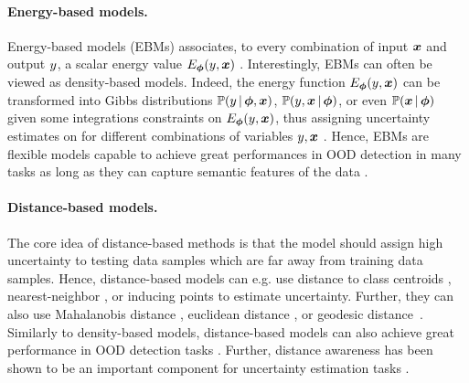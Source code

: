 \paragraph*{Energy-based models.} Energy-based models (EBMs) associates, to every combination of input $\bm{x}$ and output $y$, a scalar energy value $E_{\bm{\phi}}(y, \bm{x})$ \cite{lecun2006tutorial}. Interestingly, EBMs can often be viewed as density-based models. Indeed, the energy function $E_{\bm{\phi}}(y, \bm{x})$ can be transformed into Gibbs distributions $\mathbb{P}(y \,|\, \bm{\phi}, \bm{x})$, $\mathbb{P}(y, \bm{x} \,|\, \bm{\phi})$, or even $\mathbb{P}(\bm{x} \,|\, \bm{\phi})$ given some integrations constraints on $E_{\bm{\phi}}(y, \bm{x})$, thus assigning uncertainty estimates on for different combinations of variables $y, \bm{x}$ \cite{energy_based_classifier}. Hence, EBMs are flexible models capable to achieve great performances in OOD detection in many tasks \citep{energy-ood,wang2021ebm} as long as they can capture semantic features of the data \cite{ood_ebm}.

\paragraph*{Distance-based models.} The core idea of distance-based methods is that the model should assign high uncertainty to testing data samples which are far away from training data samples. Hence, distance-based models can e.g. use distance to class centroids \cite{mohseni2020self}, nearest-neighbor \cite{sun2022knnood}, or inducing points \cite{due} to estimate uncertainty. Further, they can also use Mahalanobis distance \cite{mohseni2020self}, euclidean distance \cite{huang2021feature}, or geodesic distance \cite{gomes2022igeood}. Similarly to density-based models, distance-based models can also achieve great performance in OOD detection tasks \cite{ood-detection-survey}. Further, distance awareness has been shown to be an important component for uncertainty estimation tasks \cite{uncertainty-distance-awareness,due}.

